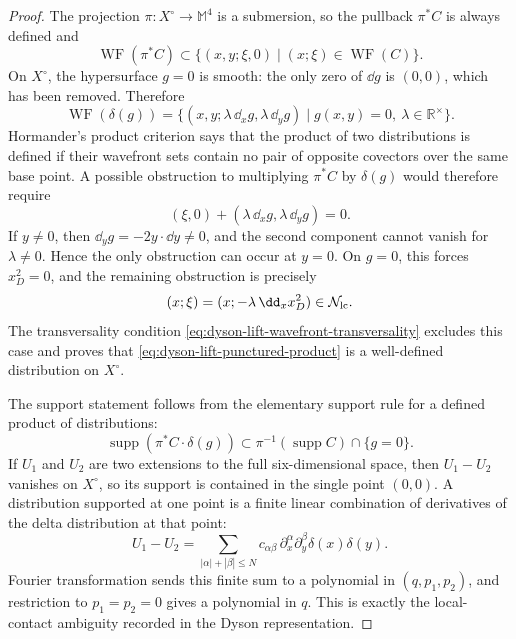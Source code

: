 \begin{proof}
The projection \(\pi:X^\circ\to\mathbb M^4\) is a submersion, so the pullback
\(\pi^*C\) is always defined and
\begin{equation}
  \operatorname{WF}(\pi^*C)
  \subset
  \{(x,y;\xi,0)\mid (x;\xi)\in\operatorname{WF}(C)\}.
  \label{eq:dyson-pullback-wavefront}
\end{equation}
On \(X^\circ\), the hypersurface \(g=0\) is smooth: the only zero of
\(\dd g\) is \((0,0)\), which has been removed.  Therefore
\begin{equation}
  \operatorname{WF}(\delta(g))
  =
  \{(x,y;\lambda\,\dd_x g,\lambda\,\dd_y g)
    \mid g(x,y)=0,\ \lambda\in\mathbb R^\times\}.
  \label{eq:dyson-delta-wavefront}
\end{equation}
Hormander's product criterion says that the product of two distributions is
defined if their wavefront sets contain no pair of opposite covectors over
the same base point.  A possible obstruction to multiplying
\(\pi^*C\) by \(\delta(g)\) would therefore require
\[
  (\xi,0)+(\lambda\,\dd_x g,\lambda\,\dd_y g)=0 .
\]
If \(y\ne0\), then \(\dd_y g=-2y\cdot\dd y\ne0\), and the second component
cannot vanish for \(\lambda\ne0\).  Hence the only obstruction can occur at
\(y=0\).  On \(g=0\), this forces \(x_D^2=0\), and the remaining obstruction
is precisely
\[
  (x;\xi)=
  (x;-\lambda\,\dd_x x_D^2)
  \in\mathcal N_{\rm lc}.
\]
The transversality condition
\eqref{eq:dyson-lift-wavefront-transversality} excludes this case and proves
that \eqref{eq:dyson-lift-punctured-product} is a well-defined distribution
on \(X^\circ\).

The support statement follows from the elementary support rule for a defined
product of distributions:
\[
  \operatorname{supp}(\pi^*C\cdot\delta(g))
  \subset
  \pi^{-1}(\operatorname{supp}C)\cap\{g=0\}.
\]
If \(U_1\) and \(U_2\) are two extensions to the full six-dimensional space,
then \(U_1-U_2\) vanishes on \(X^\circ\), so its support is contained in the
single point \((0,0)\).  A distribution supported at one point is a finite
linear combination of derivatives of the delta distribution at that point:
\[
  U_1-U_2
  =
  \sum_{|\alpha|+|\beta|\le N}
  c_{\alpha\beta}\,
  \partial_x^\alpha\partial_y^\beta
  \delta(x)\delta(y).
\]
Fourier transformation sends this finite sum to a polynomial in
\((q,p_1,p_2)\), and restriction to \(p_1=p_2=0\) gives a polynomial in
\(q\).  This is exactly the local-contact ambiguity recorded in the Dyson
representation.
\end{proof}

